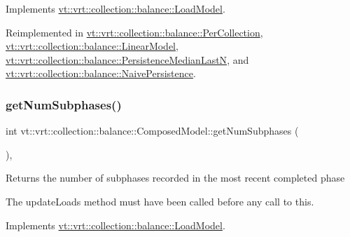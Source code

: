 Implements \hyperlink{structvt_1_1vrt_1_1collection_1_1balance_1_1_load_model_ac061725720a2017908090863080b70e5}{vt\+::vrt\+::collection\+::balance\+::\+Load\+Model}.



Reimplemented in \hyperlink{structvt_1_1vrt_1_1collection_1_1balance_1_1_per_collection_a1e2537d7294b8d1db3ed793d98dfb59c}{vt\+::vrt\+::collection\+::balance\+::\+Per\+Collection}, \hyperlink{structvt_1_1vrt_1_1collection_1_1balance_1_1_linear_model_a454177a512bbb73e246d3a7ad823c8e4}{vt\+::vrt\+::collection\+::balance\+::\+Linear\+Model}, \hyperlink{structvt_1_1vrt_1_1collection_1_1balance_1_1_persistence_median_last_n_accad4d2fe2cc3701966e13bbb5dd793c}{vt\+::vrt\+::collection\+::balance\+::\+Persistence\+Median\+LastN}, and \hyperlink{structvt_1_1vrt_1_1collection_1_1balance_1_1_naive_persistence_a7c4dcce4137f9c112a114686b6cbe691}{vt\+::vrt\+::collection\+::balance\+::\+Naive\+Persistence}.

\mbox{\label{classvt_1_1vrt_1_1collection_1_1balance_1_1_composed_model_af3ea09828c281d9c278198a19fe4e533}} 
\subsubsection{\texorpdfstring{get\+Num\+Subphases()}{getNumSubphases()}}
{\footnotesize\ttfamily int vt\+::vrt\+::collection\+::balance\+::\+Composed\+Model\+::get\+Num\+Subphases (\begin{DoxyParamCaption}{ }\end{DoxyParamCaption})\hspace{0.3cm}{\ttfamily [override]}, {\ttfamily [virtual]}}

Returns the number of subphases recorded in the most recent completed phase

The {\ttfamily update\+Loads} method must have been called before any call to this. 

Implements \hyperlink{structvt_1_1vrt_1_1collection_1_1balance_1_1_load_model_ab46ea62e4228d4a64de9dd0adfe81af2}{vt\+::vrt\+::collection\+::balance\+::\+Load\+Model}.



